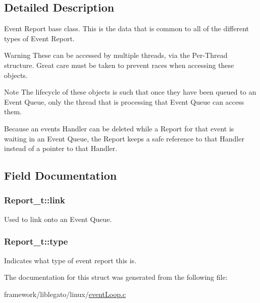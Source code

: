 \subsection{Detailed Description}
Event Report base class. This is the data that is common to all of the different types of Event Report.

\begin{DoxyWarning}{Warning}
These can be accessed by multiple threads, via the Per-\/\+Thread structure. Great care must be taken to prevent races when accessing these objects.
\end{DoxyWarning}
\begin{DoxyNote}{Note}
The lifecycle of these objects is such that once they have been queued to an Event Queue, only the thread that is processing that Event Queue can access them.

Because an event\textquotesingle{}s Handler can be deleted while a Report for that event is waiting in an Event Queue, the Report keeps a safe reference to that Handler instead of a pointer to that Handler. 
\end{DoxyNote}


\subsection{Field Documentation}
\subsubsection[{\texorpdfstring{link}{link}}]{ Report\+\_\+t\+::link}\hypertarget{struct_report__t_a4205401a86f97b70d37377e00f23e616}{}\label{struct_report__t_a4205401a86f97b70d37377e00f23e616}


Used to link onto an Event Queue. 

\subsubsection[{\texorpdfstring{type}{type}}]{ Report\+\_\+t\+::type}\hypertarget{struct_report__t_a24c836d3a3e92bfcdc6914eacd76d5e9}{}\label{struct_report__t_a24c836d3a3e92bfcdc6914eacd76d5e9}


Indicates what type of event report this is. 



The documentation for this struct was generated from the following file\+:\begin{DoxyCompactItemize}
\item 
framework/liblegato/linux/\hyperlink{event_loop_8c}{event\+Loop.\+c}\end{DoxyCompactItemize}
